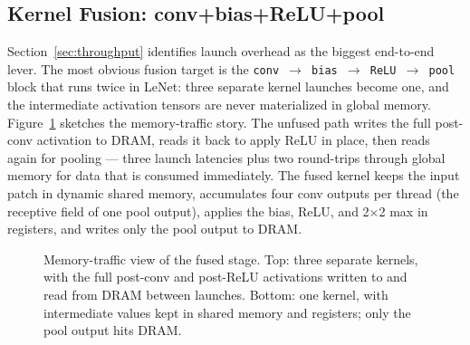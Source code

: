 \documentclass[conference]{IEEEtran}
\begin{document}
\subsection{Kernel Fusion: conv+bias+ReLU+pool}
\label{sec:fusion}
Section~\ref{sec:throughput} identifies launch overhead as the
biggest end-to-end lever. The most obvious fusion target is the
\texttt{conv $\to$ bias $\to$ ReLU $\to$ pool} block that runs
twice in LeNet: three separate kernel launches become one, and the
intermediate activation tensors are never materialized in global
memory.
Figure~\ref{fig:fusion-concept} sketches the memory-traffic story.
The unfused path writes the full post-conv activation to DRAM, reads
it back to apply ReLU in place, then reads again for pooling --- three
launch latencies plus two round-trips through global memory for data
that is consumed immediately. The fused kernel keeps the input patch
in dynamic shared memory, accumulates four conv outputs per thread
(the receptive field of one pool output), applies the bias, ReLU, and
2$\times$2 max in registers, and writes only the pool output to DRAM.

\begin{figure}[tb]
\centering
{}
\caption{Memory-traffic view of the fused stage. Top: three separate
kernels, with the full post-conv and post-ReLU activations written
to and read from DRAM between launches. Bottom: one kernel, with
intermediate values kept in shared memory and registers; only the
pool output hits DRAM.}
\label{fig:fusion-concept}
\end{figure}
\end{document}
